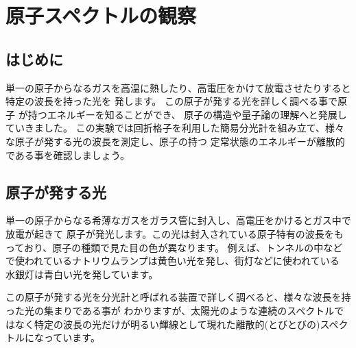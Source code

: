 %
%


\section{原子スペクトルの観察}

\subsection{はじめに}

単一の原子からなるガスを高温に熱したり、高電圧をかけて放電させたりすると特定の波長を持った光を
発します。
この原子が発する光を詳しく調べる事で原子%
が持つエネルギーを知ることができ、
原子の構造や量子論の理解へと発展していきました。
この実験では回折格子を利用した簡易分光計を組み立て、様々な原子が発する光の波長を測定し、原子の持つ
定常状態のエネルギーが離散的である事を確認しましょう。

\subsection{原子が発する光}

単一の原子からなる希薄なガスをガラス管に封入し、高電圧をかけるとガス中で放電が起きて
原子が発光します。この光は封入されている原子特有の波長をもっており、原子の種類で見た目の色が異なります。
例えば、トンネルの中などで使われているナトリウムランプは黄色い光を発し、街灯などに使われている
水銀灯は青白い光を発しています。

この原子が発する光を分光計と呼ばれる装置で詳しく調べると、様々な波長を持った光の集まりである事が
わかりますが、太陽光のような連続のスペクトルではなく特定の波長の光だけが明るい輝線として現れた離散的(とびとびの)スペクトルになっています。

